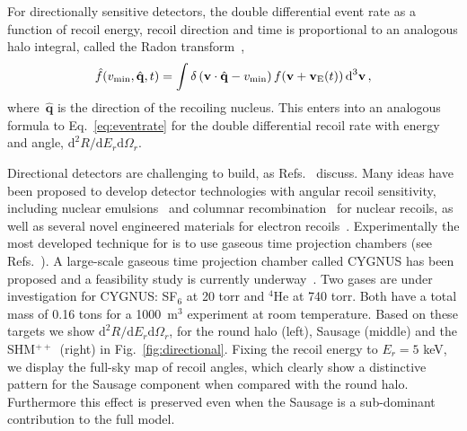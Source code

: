\documentclass[prd,10pt,twocolumn,showpacs,nofootinbib, aps,superscriptaddress,preprintnumbers]{revtex4-1}
\newcommand{\qhat}{\hat{\mathbf{q}}}
\newcommand{\vmin}{v_{\rm min}}
\newcommand{\Ciaran}[1]{\textcolor{red}{\textbf{Ciaran:} #1}}
\newcommand{\SHMpp}{SHM$^{++}$}
\begin{document}
For directionally sensitive detectors, the double differential event
rate as a function of recoil energy, recoil direction and time is
proportional to an analogous halo integral, called the Radon
transform~\cite{Gondolo:2002np,Radon},
%
\begin{equation}
 \hat{f}(\vmin,\qhat,t) = \int \delta\left(\textbf{v} \cdot \qhat - \vmin\right) f(\textbf{v}+\textbf{v}_{\mathrm{E}}(t))\, \textrm{d}^3 \textbf{v}\, ,
\end{equation}
%
where~$\qhat$ is the direction of the recoiling nucleus.
This enters into an analogous formula to Eq.~\eqref{eq:eventrate} for
the double differential recoil rate with energy and angle,
$\textrm{d}^2R/\textrm{d}E_r \textrm{d}\Omega_r$.

Directional detectors are challenging to build, as
Refs.~\cite{Ahlen:2009ev,Battat:2016xaw} discuss. Many ideas have been proposed to develop detector technologies with angular recoil
sensitivity, including nuclear
emulsions~\cite{Nygren:2013nda,Li:2015zga} and columnar
recombination~\cite{Aleksandrov:2016fyr,Agafonova:2017ajg} for nuclear
recoils, as well as several novel engineered materials for electron
recoils~\cite{Griffin:2018bjn,Hochberg:2016ntt,Hochberg:2017wce}. Experimentally
the most developed technique for is to use gaseous time projection
chambers (see
Refs.~\cite{Daw:2011wq,Battat:2014van,Battat:2016xaw,Monroe:2011er,Leyton:2016nit,Santos:2011kf,Riffard:2013psa,Nakamura:2015iza}).
A large-scale gaseous time projection chamber called CYGNUS has been
proposed and a feasibility study is currently underway~\cite{CYGNUS}.
Two gases are under investigation for CYGNUS: SF$_6$ at 20 torr and
$^4$He at 740 torr.  Both have a total mass of 0.16 tons for a
1000~m$^3$ experiment at room temperature.  Based on these targets we
show $\textrm{d}^2R/\textrm{d}E_r \textrm{d}\Omega_r$, for the round
halo (left), Sausage (middle) and the \SHMpp~(right) in
Fig.~\ref{fig:directional}.  Fixing the recoil energy to $E_r=5$ keV,
we display the full-sky map of recoil angles, which clearly show a
distinctive pattern for the Sausage component when compared with the
round halo. Furthermore this effect is preserved even when the Sausage
is a sub-dominant contribution to the full model.

\end{document}
